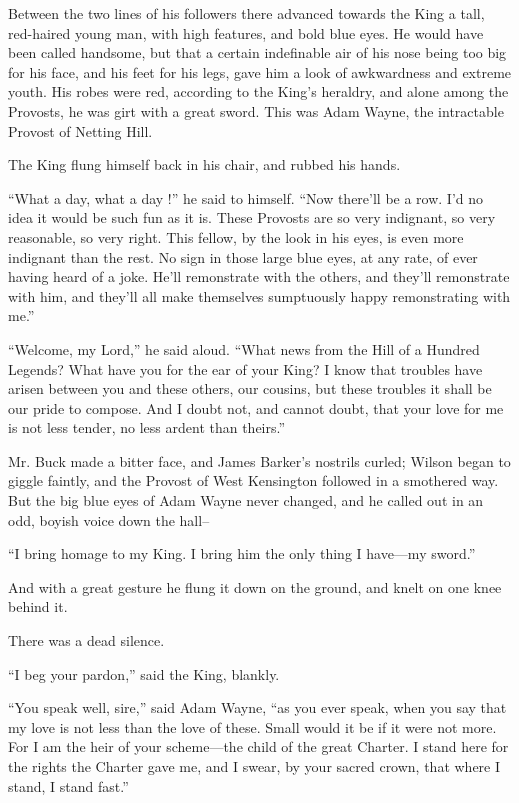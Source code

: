 \documentclass{book}
\begin{document}
Between the two lines of his followers there advanced towards the King a tall, red-haired young man, with high features, and bold blue eyes. He would have been called handsome, but that a certain indefinable air of his nose being too big for his face, and his feet for his legs, gave him a look of awkwardness and extreme youth. His robes were red, according to the King’s heraldry, and alone among the Provosts, he was girt with a great sword. This was Adam Wayne, the intractable Provost of Netting Hill.

The King flung himself back in his chair, and rubbed his hands.

“What a day, what a day !” he said to himself. “Now there’ll be a row. I’d no idea it would be such fun as it is. These Provosts are so very indignant, so very reasonable, so very right. This fellow, by the look in his eyes, is even more indignant than the rest. No sign in those large blue eyes, at any rate, of ever having heard of a joke. He’ll remonstrate with the others, and they’ll remonstrate with him, and they’ll all make themselves sumptuously happy remonstrating with me.”

“Welcome, my Lord,” he said aloud. “What news from the Hill of a Hundred Legends? What have you for the ear of your King? I know that troubles have arisen between you and these others, our cousins, but these troubles it shall be our pride to compose. And I doubt not, and cannot doubt, that your love for me is not less tender, no less ardent than theirs.”

Mr. Buck made a bitter face, and James Barker’s nostrils curled; Wilson began to giggle faintly, and the Provost of West Kensington followed in a smothered way. But the big blue eyes of Adam Wayne never changed, and he called out in an odd, boyish voice down the hall–

“I bring homage to my King. I bring him the only thing I have—my sword.”

And with a great gesture he flung it down on the ground, and knelt on one knee behind it.

There was a dead silence.

“I beg your pardon,” said the King, blankly.

“You speak well, sire,” said Adam Wayne, “as you ever speak, when you say that my love is not less than the love of these. Small would it be if it were not more. For I am the heir of your scheme—the child of the great Charter. I stand here for the rights the Charter gave me, and I swear, by your sacred crown, that where I stand, I stand fast.”
\end{document}
